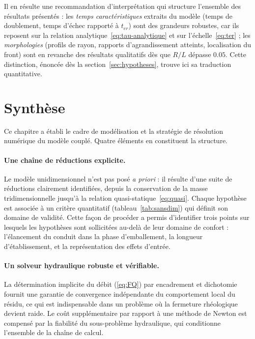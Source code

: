 \documentclass[11pt,a4paper]{report}
\newcommand{\ter}{{t_{er}}}
\begin{document}
Il en résulte une recommandation d'interprétation qui structure l'ensemble des résultats présentés : les
\emph{temps caractéristiques} extraits du modèle (temps de doublement, temps d'échec rapporté à \(\ter\))
sont des grandeurs robustes, car ils reposent sur la relation analytique~\eqref{eq:tau-analytique} et sur
l'échelle~\eqref{eq:ter} ; les \emph{morphologies} (profils de rayon, rapports d'agrandissement atteints,
localisation du front) sont en revanche des résultats qualitatifs dès que \(R/L\) dépasse \(0.05\). Cette
distinction, énoncée dès la section~\ref{sec:hypotheses}, trouve ici sa traduction quantitative.

\section{Synthèse}
\label{sec:synthese-chap}

Ce chapitre a établi le cadre de modélisation et la stratégie de résolution numérique du modèle couplé.
Quatre éléments en constituent la structure.

\paragraph{Une chaîne de réductions explicite.} Le modèle unidimensionnel n'est pas posé \emph{a priori} :
il résulte d'une suite de réductions clairement identifiées, depuis la conservation de la masse
tridimensionnelle jusqu'à la relation quasi-statique~\eqref{eq:quasi}. Chaque hypothèse est associée à un
critère quantitatif (tableau~\ref{tab:sansdim}) qui définit son domaine de validité. Cette façon de
procéder a permis d'identifier trois points sur lesquels les hypothèses sont sollicitées au-delà de leur
domaine de confort : l'élancement du conduit dans la phase d'emballement, la longueur d'établissement, et
la représentation des effets d'entrée.

\paragraph{Un solveur hydraulique robuste et vérifiable.} La détermination implicite du débit
(\eqref{eq:FQ}) par encadrement et dichotomie fournit une garantie de convergence indépendante du
comportement local du résidu, ce qui est indispensable dans un problème où la fermeture rhéologique
devient raide. Le coût supplémentaire par rapport à une méthode de Newton est compensé par la fiabilité
du sous-problème hydraulique, qui conditionne l'ensemble de la chaîne de calcul.
\end{document}
